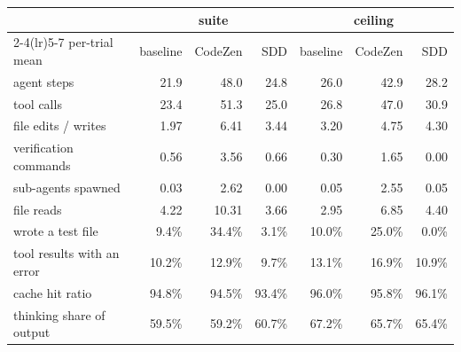 
\begin{tabular}{@{}lrrrrrr@{}}
\toprule
 & \multicolumn{3}{c}{\textbf{suite}} & \multicolumn{3}{c}{\textbf{ceiling}} \\
\cmidrule(lr){2-4}\cmidrule(lr){5-7}
per-trial mean & baseline & CodeZen & SDD & baseline & CodeZen & SDD \\
\midrule
agent steps & 21.9 & 48.0 & 24.8 & 26.0 & 42.9 & 28.2 \\
tool calls & 23.4 & 51.3 & 25.0 & 26.8 & 47.0 & 30.9 \\
file edits / writes & 1.97 & 6.41 & 3.44 & 3.20 & 4.75 & 4.30 \\
verification commands & 0.56 & 3.56 & 0.66 & 0.30 & 1.65 & 0.00 \\
sub-agents spawned & 0.03 & 2.62 & 0.00 & 0.05 & 2.55 & 0.05 \\
file reads & 4.22 & 10.31 & 3.66 & 2.95 & 6.85 & 4.40 \\
wrote a test file & 9.4\% & 34.4\% & 3.1\% & 10.0\% & 25.0\% & 0.0\% \\
tool results with an error & 10.2\% & 12.9\% & 9.7\% & 13.1\% & 16.9\% & 10.9\% \\
cache hit ratio & 94.8\% & 94.5\% & 93.4\% & 96.0\% & 95.8\% & 96.1\% \\
thinking share of output & 59.5\% & 59.2\% & 60.7\% & 67.2\% & 65.7\% & 65.4\% \\
\bottomrule
\end{tabular}
